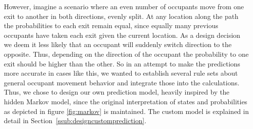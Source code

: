 However, imagine a scenario where an even number of occupants move from one exit to another in both directions, evenly split. At any location along the path the probabilities to each exit remain equal, since equally many previous occupants have taken each exit given the current location. As a design decision we deem it less likely that an occupant will suddenly switch direction to the opposite. Thus, depending on the direction of the occupant the probability to one exit should be higher than the other. So in an attempt to make the predictions more accurate in cases like this, we wanted to establish several rule sets about general occupant movement behavior and integrate those into the calculations. Thus, we chose to design our own prediction model, heavily inspired by the hidden Markov model, since the original interpretation of states and probabilities as depicted in figure \ref{fig:markov} is maintained. The custom model is explained in detail in Section~\ref{ssub:designcustomprediction}. 